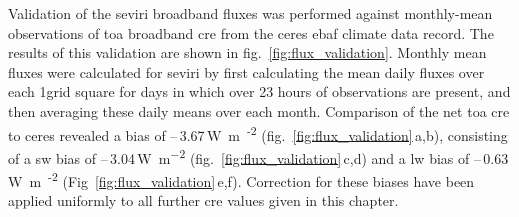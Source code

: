 Validation of the \acrshort{seviri} broadband fluxes was performed against monthly-mean observations of \acrshort{toa} broadband \acrshort{cre} from the \acrfull{ceres} \citep{loeb_clouds_2018} \acrfull{ebaf} climate data record. 
The results of this validation are shown in fig.~\ref{fig:flux_validation}. 
Monthly mean fluxes were calculated for \acrshort{seviri} by first calculating the mean daily fluxes over each 1\textdegree grid square for days in which over 23 hours of observations are present, and then averaging these daily means over each month. 
Comparison of the net \acrshort{toa} \acrshort{cre} to \acrshort{ceres} revealed a bias of --\,3.67\,\unit{W m\textsuperscript{-2}} (fig.~\ref{fig:flux_validation}\,a,b), consisting of a \acrshort{sw} bias of --\,3.04\,\unit{W m^{-2}} (fig.~\ref{fig:flux_validation}\,c,d) and a \acrshort{lw} bias of --\,0.63\,\unit{W m\textsuperscript{-2}} (Fig~\ref{fig:flux_validation}\,e,f). 
Correction for these biases have been applied uniformly to all further \acrshort{cre} values given in this chapter.


